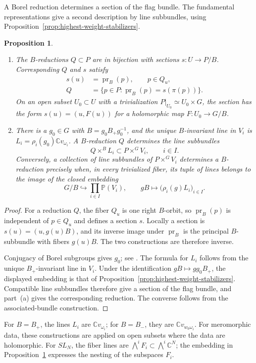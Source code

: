\documentclass[11pt,leqno]{amsart}
\numberwithin{equation}{section}
\theoremstyle{plain}
\newtheorem{proposition}[theorem]{Proposition}
\theoremstyle{definition}
\theoremstyle{plain}
\theoremstyle{definition}
\theoremstyle{remark}
\begin{document}
A Borel reduction determines a section of the flag bundle. The fundamental representations give a second description by line subbundles, using Proposition~\ref{prop:highest-weight-stabilizers}.
\begin{proposition}\label{prop:fundamental-flag-embedding}
\begin{enumerate}[label=(\alph*),topsep=3pt,itemsep=3pt]
\item The $B$-reductions $Q\subset P$ are in bijection with sections $s:U\to P/B$.  Corresponding $Q$ and $s$ satisfy
\[
 \begin{aligned}
 s(u)&=\operatorname{pr}_{B}(p),\qquad p\in Q_u,\\
 Q&=\{p\in P:\operatorname{pr}_{B}(p)=s(\pi(p))\}.
 \end{aligned}
\]
On an open subset $U_0\subset U$ with a trivialization $P|_{U_0}\simeq U_0\times G$, the section has the form $s(u)=(u,F(u))$ for a holomorphic map $F:U_0\to G/B$.
\item There is a $g_0\in G$ with $B=g_0B_+g_0^{-1}$, and the unique $B$-invariant line in $V_i$ is $L_i=\rho_i(g_0)\mathbb Cv_{\omega_i}$.  A $B$-reduction $Q$ determines the line subbundles
\[
 Q\times^{B}L_i\subset P\times^G V_i,
 \qquad i\in I.
\]
Conversely, a collection of line subbundles of $P\times^G V_i$ determines a $B$-reduction precisely when, in every trivialized fiber, its tuple of lines belongs to the image of the closed embedding
\[
 G/B\hookrightarrow\prod_{i\in I}\mathbb P(V_i),\qquad
 gB\longmapsto\bigl(\rho_i(g)L_i\bigr)_{i\in I}.
\]
\end{enumerate}
\end{proposition}
\begin{proof}
For a reduction $Q$, the fiber $Q_u$ is one right $B$-orbit, so $\operatorname{pr}_{B}(p)$ is independent of $p\in Q_u$ and defines a section $s$.  Locally a section is $s(u)=(u,g(u)B)$, and its inverse image under $\operatorname{pr}_{B}$ is the principal $B$-subbundle with fibers $g(u)B$.  The two constructions are therefore inverse.

Conjugacy of Borel subgroups gives $g_0$; see \cite{Milne2017}.  The formula for $L_i$ follows from the unique $B_+$-invariant line in $V_i$.  Under the identification $gB\mapsto gg_0B_+$, the displayed embedding is that of Proposition~\ref{prop:highest-weight-stabilizers}.  Compatible line subbundles therefore give a section of the flag bundle, and part~(a) gives the corresponding reduction.  The converse follows from the associated-bundle construction.
\end{proof}
For $B=B_+$, the lines $L_i$ are $\mathbb Cv_{\omega_i}$; for $B=B_-$, they are $\mathbb Cv_{w_0\omega_i}$.  For meromorphic data, these constructions are applied on open subsets where the data are holomorphic.  For $SL_N$, the fiber lines are $\bigwedge^iF_i\subset\bigwedge^i\mathbb C^N$; the embedding in Proposition~\ref{prop:fundamental-flag-embedding} expresses the nesting of the subspaces $F_i$.
\end{document}
